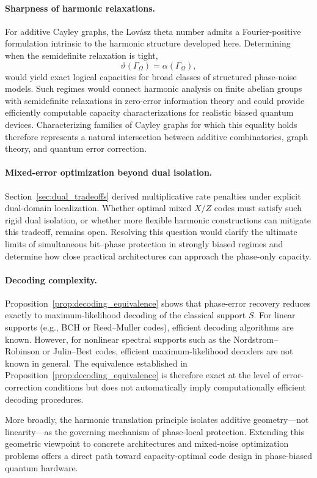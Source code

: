 \documentclass[a4paper,twocolumn,11pt,allowtoday]{quantumarticle}
\theoremstyle{plain}
\theoremstyle{definition}
\theoremstyle{remark}
\begin{document}
\paragraph{Sharpness of harmonic relaxations.}
For additive Cayley graphs, the Lovász theta number admits a Fourier-positive formulation intrinsic to the harmonic structure developed here. Determining when the semidefinite relaxation is tight,
\[
\vartheta(\Gamma_\Omega)=\alpha(\Gamma_\Omega),
\]
would yield exact logical capacities for broad classes of structured phase-noise models. Such regimes would connect harmonic analysis on finite abelian groups with semidefinite relaxations in zero-error information theory and could provide efficiently computable capacity characterizations for realistic biased quantum devices. Characterizing families of Cayley graphs for which this equality holds therefore represents a natural intersection between additive combinatorics, graph theory, and quantum error correction.

\paragraph{Mixed-error optimization beyond dual isolation.}
Section~\ref{sec:dual_tradeoffs} derived multiplicative rate penalties under explicit dual-domain localization. Whether optimal mixed $X/Z$ codes must satisfy such rigid dual isolation, or whether more flexible harmonic constructions can mitigate this tradeoff, remains open. Resolving this question would clarify the ultimate limits of simultaneous bit–phase protection in strongly biased regimes and determine how close practical architectures can approach the phase-only capacity.

\paragraph{Decoding complexity.}
Proposition~\ref{prop:decoding_equivalence} shows that phase-error recovery reduces exactly to maximum-likelihood decoding of the classical support $S$. For linear supports (e.g., BCH or Reed–Muller codes), efficient decoding algorithms are known. However, for nonlinear spectral supports such as the Nordstrom–Robinson or Julin–Best codes, efficient maximum-likelihood decoders are not known in general. The equivalence established in Proposition~\ref{prop:decoding_equivalence} is therefore exact at the level of error-correction conditions but does not automatically imply computationally efficient decoding procedures.

More broadly, the harmonic translation principle isolates additive geometry—not linearity—as the governing mechanism of phase-local protection. Extending this geometric viewpoint to concrete architectures and mixed-noise optimization problems offers a direct path toward capacity-optimal code design in phase-biased quantum hardware.




\end{document}
